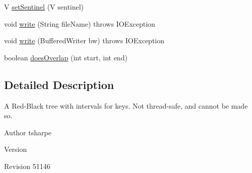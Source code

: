 \begin{DoxyCompactItemize}
\item 
V \hyperlink{classbroad_1_1core_1_1datastructures_1_1_interval_tree_3_01_v_01_4_a698672fc6e999de06d624f40ef26d0f4}{set\+Sentinel} (V sentinel)
\item 
void \hyperlink{classbroad_1_1core_1_1datastructures_1_1_interval_tree_3_01_v_01_4_a85c8bee3ccb47c4f9805f3d80629911d}{write} (String file\+Name)  throws I\+O\+Exception 
\item 
void \hyperlink{classbroad_1_1core_1_1datastructures_1_1_interval_tree_3_01_v_01_4_ad969831085254021fb11bf3e9db2acc4}{write} (Buffered\+Writer bw)  throws I\+O\+Exception 
\item 
boolean \hyperlink{classbroad_1_1core_1_1datastructures_1_1_interval_tree_3_01_v_01_4_afd101fc656923420578d290819551325}{does\+Overlap} (int start, int end)
\end{DoxyCompactItemize}


\subsection{Detailed Description}
A Red-\/\+Black tree with intervals for keys. Not thread-\/safe, and cannot be made so.

\begin{DoxyAuthor}{Author}
tsharpe 
\end{DoxyAuthor}
\begin{DoxyVersion}{Version}

\end{DoxyVersion}
\begin{DoxyParagraph}{Revision}
51146 
\end{DoxyParagraph}



